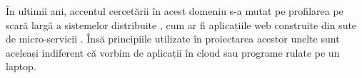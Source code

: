 În ultimii ani, accentul cercetării în acest domeniu s-a mutat pe profilarea pe scară largă a sistemelor distribuite \cite{google_wide_profiling}, cum ar fi aplicațiile web construite din sute de micro-servicii \cite{profiling_microservices}. Însă principiile utilizate în proiectarea acestor unelte sunt aceleași indiferent că vorbim de aplicații în cloud sau programe rulate pe un laptop.